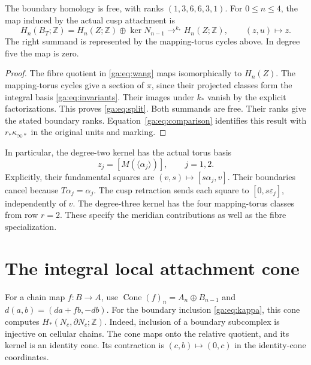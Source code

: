 \begin{theorem}\label{ga:thm:boundary}
The boundary homology is free, with ranks $(1,3,6,6,3,1)$.
For $0\leq n\leq4$, the map induced by the actual cusp attachment is
\begin{equation}\label{ga:eq:split}
H_n(B_T;\mathbb Z)=H_n(Z;\mathbb Z)\oplus\ker N_{n-1}
\mathrel{\mathop{\longrightarrow}^{k_*}}H_n(Z;\mathbb Z),
\qquad (z,u)\longmapsto z.
\end{equation}
The right summand is represented by the mapping-torus cycles above.
In degree five the map is zero.
\end{theorem}
\begin{proof}
The fibre quotient in \eqref{ga:eq:wang} maps isomorphically to $H_n(Z)$.
The mapping-torus cycles give a section of $\pi$, since their projected
classes form the integral basis \eqref{ga:eq:invariants}.
Their images under $k_*$ vanish by the explicit factorizations.
This proves \eqref{ga:eq:split}. Both summands are free.
Their ranks give the stated boundary ranks.
Equation~\eqref{ga:eq:comparison} identifies this result with
$r_*\kappa_{\infty*}$ in the original units and marking.
\end{proof}

In particular, the degree-two kernel has the actual torus basis
\begin{equation}\label{ga:eq:kernel2}
z_j=[M(\langle\alpha_j\rangle)],\qquad j=1,2.
\end{equation}
Explicitly, their fundamental squares are $(v,s)\mapsto[s\alpha_j,v]$.
Their boundaries cancel because $T\alpha_j=\alpha_j$.
The cusp retraction sends each square to $[0,s\varepsilon_j]$, independently of $v$.
The degree-three kernel has the four mapping-torus classes from row $r=2$.
These specify the meridian contributions as well as the fibre specialization.

\section{The integral local attachment cone}

For a chain map $f:B\to A$, use
$\operatorname{Cone}(f)_n=A_n\oplus B_{n-1}$ and
$d(a,b)=(da+fb,-db)$.
For the boundary inclusion \eqref{ga:eq:kappa}, this cone computes
$H_*(N_c,\partial N_c;\mathbb Z)$.
Indeed, inclusion of a boundary subcomplex is injective on cellular chains.
The cone maps onto the relative quotient, and its kernel is an identity cone.
Its contraction is $(c,b)\mapsto(0,c)$ in the identity-cone coordinates.

